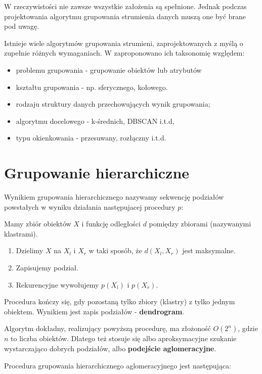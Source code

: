 \documentclass[11pt]{mgr}
\begin{document}
W rzeczywistości nie zawsze wszystkie założenia są spełnione. Jednak
podczas projektowania algorytmu grupowania strumienia danych muszą
one być brane pod uwagę.

Istnieje wiele algorytmów grupowania strumieni, zaprojektowanych z myślą o zupełnie różnych wymaganiach. W \cite{silva2013data} zaproponowano ich taksonomię względem:
\begin{itemize}
\item problemu grupowania - grupowanie obiektów lub atrybutów
\item kształtu grupowania - np. sferycznego, kołowego.
\item rodzaju struktury danych przechowujących wynik grupowania;
\item algorytmu docelowego - k-średnich, DBSCAN i.t.d,
\item typu okienkowania - przesuwany, rozłączny i.t.d.
\end{itemize}

\section{Grupowanie hierarchiczne}\label{grupowanie-hierarchiczne}

Wynikiem grupowania hierarchicznego nazywamy sekwencję podziałów powstałych w wyniku działania następujacej procedury \(p\):

Mamy zbiór obiektów \(X\) i funkcję odległości \(d\) pomiędzy zbiorami
(nazywanymi klastrami).

\begin{enumerate}
\item
  Dzielimy \(X\) na \(X_{l}\) i \(X_{r}\) w taki sposób, że
  \(d( X_{l}, X_{r})\) jest maksymalne.
\item
  Zapisujemy podział.
\item
  Rekurencyjne wywołujemy \(p(X_{l})\) i \(p(X_{r})\).
\end{enumerate}

Procedura kończy się, gdy pozostaną tylko zbiory (klastry) z tylko jednym obiektem. Wynikiem jest zapis podziałów - \textbf{dendrogram}.

Algorytm dokładny, realizujący powyższą procedurę, ma złożoność \(O(2^n)\), gdzie \(n\) to liczba obiektów. Dlatego też stosuje się albo aproksymacyjne szukanie wystarczająco dobrych podziałów, albo \textbf{podejście aglomeracyjne}.

Procedura grupowania hierarchicznego aglomeracyjnego jest następująca:
\end{document}
